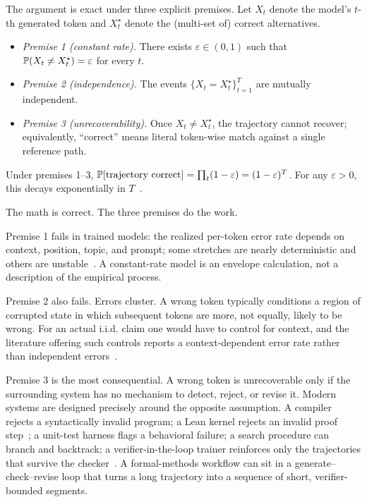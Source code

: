 The argument is exact under three explicit premises.
Let $X_t$ denote the model's $t$-th generated token and $X_t^\star$ denote the (multi-set of) correct alternatives.
\begin{itemize}
  \item \emph{Premise 1 (constant rate).}
        There exists $\varepsilon \in (0,1)$ such that $\mathbb{P}(X_t \neq X_t^\star) = \varepsilon$ for every $t$.
  \item \emph{Premise 2 (independence).}
        The events $\{X_t = X_t^\star\}_{t=1}^{T}$ are mutually independent.
  \item \emph{Premise 3 (unrecoverability).}
        Once $X_t \neq X_t^\star$, the trajectory cannot recover; equivalently, ``correct'' means literal token-wise match against a single reference path.
\end{itemize}
Under premises 1--3, $\mathbb{P}[\text{trajectory correct}] = \prod_t (1-\varepsilon) = (1-\varepsilon)^T$.
For any $\varepsilon > 0$, this decays exponentially in $T$~\citep{lecun2022autonomous,bachmann2024pitfalls}.

The math is correct.
The three premises do the work.

Premise 1 fails in trained models: the realized per-token error rate depends on context, position, topic, and prompt;
some stretches are nearly deterministic and others are unstable~\citep{kalai2024calibrated}.
A constant-rate model is an envelope calculation, not a description of the empirical process.

Premise 2 also fails.
Errors cluster.
A wrong token typically conditions a region of corrupted state in which subsequent tokens are more, not equally, likely to be wrong.
For an actual i.i.d. claim one would have to control for context, and the literature offering such controls reports a context-dependent error rate rather than independent errors~\citep{stechly2024chain,lin2024diverging}.

Premise 3 is the most consequential.
A wrong token is unrecoverable only if the surrounding system has no mechanism to detect, reject, or revise it.
Modern systems are designed precisely around the opposite assumption.
A compiler rejects a syntactically invalid program;
a Lean kernel rejects an invalid proof step~\citep{moura2021lean};
a unit-test harness flags a behavioral failure;
a search procedure can branch and backtrack;
a verifier-in-the-loop trainer reinforces only the trajectories that survive the checker~\citep{lightman2024lets,uesato2022solving}.
A formal-methods workflow can sit in a generate--check--revise loop that turns a long trajectory into a sequence of short, verifier-bounded segments.

